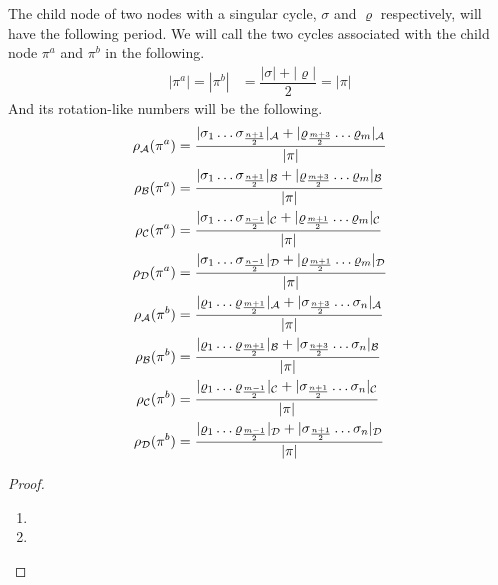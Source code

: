 \begin{theorem}
    The child node of two nodes with a singular cycle, $\sigma$ and $\varrho$ respectively, will have the following period.
    We will call the two cycles associated with the child node $\pi^a$ and $\pi^b$ in the following.
    \begin{align*}
        |\pi^a| = |\pi^b| & = \dfrac{|\sigma| + |\varrho|}{2} = |\pi|
    \end{align*}
    And its rotation-like numbers will be the following.
    \begin{align*}
        \rho_{\mathcal{A}}(\pi^a) & = \dfrac{|\sigma_1 \dots \sigma_{\frac{n+1}{2}}|_{\mathcal{A}} + |\varrho_{\frac{m+3}{2}} \dots \varrho_m|_{\mathcal{A}}}{|\pi|} \\
        \rho_{\mathcal{B}}(\pi^a) & = \dfrac{|\sigma_1 \dots \sigma_{\frac{n+1}{2}}|_{\mathcal{B}} + |\varrho_{\frac{m+3}{2}} \dots \varrho_m|_{\mathcal{B}}}{|\pi|} \\
        \rho_{\mathcal{C}}(\pi^a) & = \dfrac{|\sigma_1 \dots \sigma_{\frac{n-1}{2}}|_{\mathcal{C}} + |\varrho_{\frac{m+1}{2}} \dots \varrho_m|_{\mathcal{C}}}{|\pi|} \\
        \rho_{\mathcal{D}}(\pi^a) & = \dfrac{|\sigma_1 \dots \sigma_{\frac{n-1}{2}}|_{\mathcal{D}} + |\varrho_{\frac{m+1}{2}} \dots \varrho_m|_{\mathcal{D}}}{|\pi|} \\
        \rho_{\mathcal{A}}(\pi^b) & = \dfrac{|\varrho_1 \dots \varrho_{\frac{m+1}{2}}|_{\mathcal{A}} + |\sigma_{\frac{n+3}{2}} \dots \sigma_n|_{\mathcal{A}}}{|\pi|} \\
        \rho_{\mathcal{B}}(\pi^b) & = \dfrac{|\varrho_1 \dots \varrho_{\frac{m+1}{2}}|_{\mathcal{B}} + |\sigma_{\frac{n+3}{2}} \dots \sigma_n|_{\mathcal{B}}}{|\pi|} \\
        \rho_{\mathcal{C}}(\pi^b) & = \dfrac{|\varrho_1 \dots \varrho_{\frac{m-1}{2}}|_{\mathcal{C}} + |\sigma_{\frac{n+1}{2}} \dots \sigma_n|_{\mathcal{C}}}{|\pi|} \\
        \rho_{\mathcal{D}}(\pi^b) & = \dfrac{|\varrho_1 \dots \varrho_{\frac{m-1}{2}}|_{\mathcal{D}} + |\sigma_{\frac{n+1}{2}} \dots \sigma_n|_{\mathcal{D}}}{|\pi|}
    \end{align*}
\end{theorem}

\begin{proof} \phantom{x}
    \begin{enumerate}
        \item {}
        \item {}
    \end{enumerate}
\end{proof}


